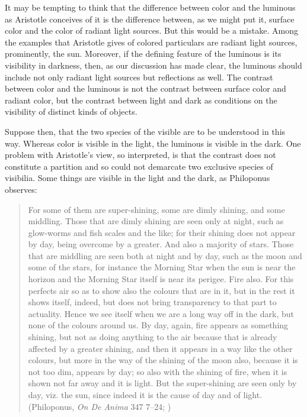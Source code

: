 It may be tempting to think that the difference between color and the luminous as Aristotle conceives of it is the difference between, as we might put it, surface color and the color of radiant light sources. But this would be a mistake. Among the examples that Aristotle gives of colored particulars are radiant light sources, prominently, the sun. Moreover, if the defining feature of the luminous is its visibility in darkness, then, as our discussion has made clear, the luminous should include not only radiant light sources but reflections as well. The contrast between color and the luminous is not the contrast between surface color and radiant color, but the contrast between light and dark as conditions on the visibility of distinct kinds of objects.

Suppose then, that the two species of the visible are to be understood in this way. Whereas color is visible in the light, the luminous is visible in the dark. One problem with Aristotle's view, so interpreted, is that the contrast does not constitute a partition and so could not demarcate two exclusive species of visibilia. Some things are visible in the light and the dark, as Philoponus observes:
\begin{quote}
	For some of them are super-shining, some are dimly shining, and some middling. Those that are dimly shining are seen only at night, such as glow-worms and fish scales and the like; for their shining does not appear by day, being overcome by a greater. And also a majority of stars. Those that are middling are seen both at night and by day, such as the moon and some of the stars, for instance the Morning Star when the sun is near the horizon and the Morning Star itself is near its perigee. Fire also. For this perfects air so as to show also the colours that are in it, but in the rest it shows itself, indeed, but does not bring transparency to that part to actuality. Hence we see itself when we are a long way off in the dark, but none of the colours around us. By day, again, fire appears as something shining, but not as doing anything to the air because that is already affected by a greater shining, and then it appears in a way like the other colours, but more in the way of the shining of the moon also, because it is not too dim, appears by day; so also with the shining of fire, when it is shown not far away and it is light. But the super-shining are seen only by day, viz. the sun, since indeed it is the cause of day and of light. (Philoponus, \emph{On \emph{De Anima}} 347 7--24; \citealt[32]{Charlton:2005fk})
\end{quote}

